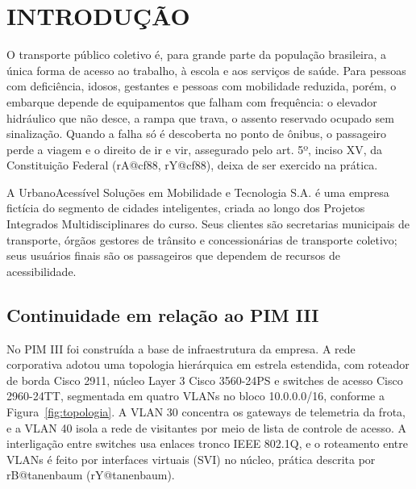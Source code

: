 \documentclass[12pt,a4paper,oneside]{report}
\makeatletter
\renewcommand{\contentsname}{Sumário}
\renewcommand{\cite}[1]{(\csname rA@#1\endcsname, \csname rY@#1\endcsname)}
\newcommand{\citeonline}[1]{\csname rB@#1\endcsname{} (\csname rY@#1\endcsname)}
\makeatother
\begin{document}
\thispagestyle{empty}
\renewcommand{\contentsname}{Sumário}{\singlespacing\tableofcontents}
\thispagestyle{empty}
\clearpage

\chapter{INTRODUÇÃO}

O transporte público coletivo é, para grande parte da população brasileira, a única forma de acesso ao
trabalho, à escola e aos serviços de saúde. Para pessoas com deficiência, idosos, gestantes e pessoas com
mobilidade reduzida, porém, o embarque depende de equipamentos que falham com frequência: o elevador
hidráulico que não desce, a rampa que trava, o assento reservado ocupado sem sinalização. Quando a falha
só é descoberta no ponto de ônibus, o passageiro perde a viagem e o direito de ir e vir, assegurado pelo
art. 5º, inciso XV, da Constituição Federal \cite{cf88}, deixa de ser exercido na prática.

A UrbanoAcessível Soluções em Mobilidade e Tecnologia S.A. é uma empresa fictícia do segmento de cidades
inteligentes, criada ao longo dos Projetos Integrados Multidisciplinares do curso. Seus clientes são
secretarias municipais de transporte, órgãos gestores de trânsito e concessionárias de transporte
coletivo; seus usuários finais são os passageiros que dependem de recursos de acessibilidade.

\section{Continuidade em relação ao PIM III}

No PIM III foi construída a base de infraestrutura da empresa. A rede corporativa adotou uma topologia
hierárquica em estrela estendida, com roteador de borda Cisco 2911, núcleo Layer 3 Cisco 3560-24PS e
switches de acesso Cisco 2960-24TT, segmentada em quatro VLANs no bloco 10.0.0.0/16, conforme a
Figura~\ref{fig:topologia}. A VLAN 30 concentra os gateways de telemetria da frota, e a VLAN 40 isola a
rede de visitantes por meio de lista de controle de acesso. A interligação entre switches usa enlaces
tronco IEEE 802.1Q, e o roteamento entre VLANs é feito por interfaces virtuais (SVI) no núcleo, prática
descrita por \citeonline{tanenbaum}.
\end{document}
